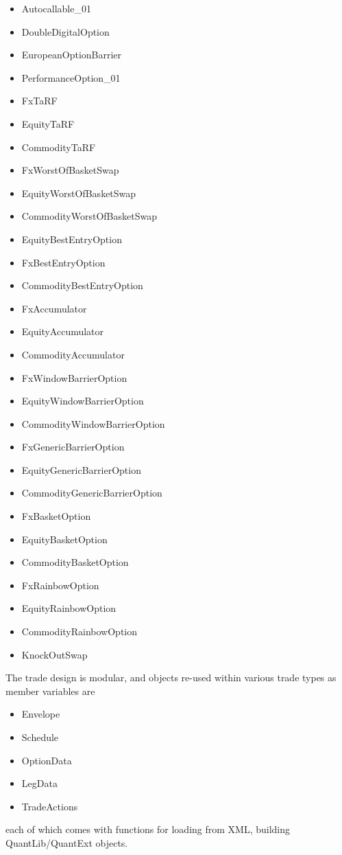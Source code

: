 \documentclass[12pt, a4paper]{report}
\begin{document}
\begin{itemize}
      \item Autocallable\_01
      \item DoubleDigitalOption
      \item EuropeanOptionBarrier
      \item PerformanceOption\_01
      \item FxTaRF
      \item EquityTaRF
      \item CommodityTaRF
      \item FxWorstOfBasketSwap
      \item EquityWorstOfBasketSwap
      \item CommodityWorstOfBasketSwap
      \item EquityBestEntryOption
      \item FxBestEntryOption
      \item CommodityBestEntryOption
      \item FxAccumulator
      \item EquityAccumulator
      \item CommodityAccumulator
      \item FxWindowBarrierOption
      \item EquityWindowBarrierOption
      \item CommodityWindowBarrierOption
      \item FxGenericBarrierOption
      \item EquityGenericBarrierOption
      \item CommodityGenericBarrierOption
      \item FxBasketOption
      \item EquityBasketOption
      \item CommodityBasketOption
      \item FxRainbowOption
      \item EquityRainbowOption
      \item CommodityRainbowOption
      \item KnockOutSwap
 \end{itemize}

The trade design is modular, and objects re-used within various trade types as member variables are
\begin{itemize}
\item Envelope
\item Schedule
\item OptionData
\item LegData
\item TradeActions
\end{itemize}
each of which comes with functions for loading from XML, building QuantLib/QuantExt objects.
\end{document}
